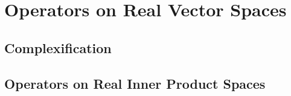 \chapter{Operators on Real Vector Spaces}

\section{Complexification}

\section{Operators on Real Inner Product Spaces}

